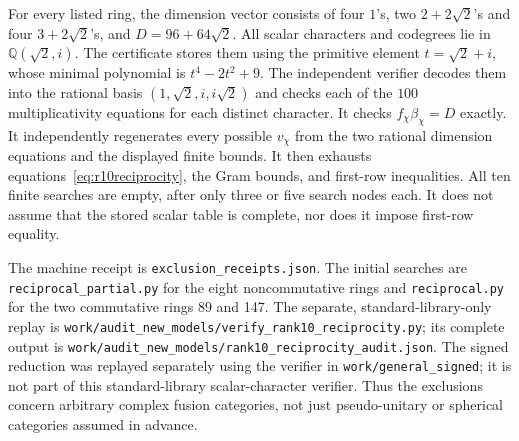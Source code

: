 For every listed ring, the dimension vector consists of four $1$'s,
two $2+2\sqrt2$'s and four $3+2\sqrt2$'s, and
$D=96+64\sqrt2$. All scalar characters and codegrees lie in
$\mathbb Q(\sqrt2,i)$. The certificate stores them using the primitive
element $t=\sqrt2+i$, whose minimal polynomial is $t^4-2t^2+9$.
The independent verifier decodes them into the rational basis
$(1,\sqrt2,i,i\sqrt2)$ and checks each of the $100$ multiplicativity
equations for each distinct character. It checks $f_\chi\beta_\chi=D$
exactly. It independently regenerates every possible $v_\chi$ from the
two rational dimension equations and the displayed finite bounds.
It then exhausts equations~\eqref{eq:r10reciprocity}, the Gram bounds,
and first-row inequalities. All ten finite searches are empty, after
only three or five search nodes each. It does not assume that the stored
scalar table is complete, nor does it impose first-row equality.

The machine receipt is \nolinkurl{exclusion_receipts.json}. The initial
searches are \nolinkurl{reciprocal_partial.py} for the eight noncommutative
rings and \nolinkurl{reciprocal.py} for the two commutative rings 89 and 147.
The separate, standard-library-only replay is
\nolinkurl{work/audit_new_models/verify_rank10_reciprocity.py}; its complete
output is \nolinkurl{work/audit_new_models/rank10_reciprocity_audit.json}.
The signed reduction was replayed separately using the verifier in
\nolinkurl{work/general_signed}; it is not part of this standard-library
scalar-character verifier. Thus the
exclusions concern arbitrary complex fusion categories, not just
pseudo-unitary or spherical categories assumed in advance.
